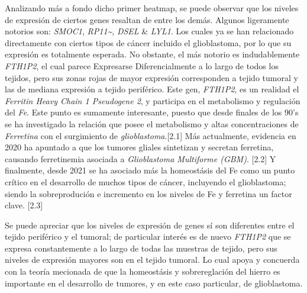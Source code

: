 \documentclass[
]{article}
\begin{document}
Analizando más a fondo dicho primer heatmap, se puede observar que los
niveles de expresión de ciertos genes resaltan de entre los demás.
Algunos ligeramente notorios son: \emph{SMOC1},
\emph{RP11\textasciitilde{}}, \emph{DSEL} \& \emph{LYL1}. Los cuales ya
se han relacionado directamente con ciertos tipos de cáncer incluido el
glioblastoma, por lo que su expresión es totalmente esperada. No
obstante, el más notorio es indudablemente \emph{FTH1P2}, el cual parece
Expresarse Diferencialmente a lo largo de todos los tejidos, pero sus
zonas rojas de mayor expresión corresponden a tejido tumoral y las de
mediana expresión a tejido periférico. Este gen, \emph{FTH1P2}, es un
realidad el \emph{Ferritin Heavy Chain 1 Pseudogene 2}, y participa en
el metabolismo y regulación del \emph{Fe}. Este punto es sumamente
interesante, puesto que desde finales de los 90's se ha investigado la
relación que posee el metabolismo y altas concentraciones de
\emph{Ferretina} con el surgimiento de \emph{glioblastoma}.{[}2.1{]} Más
actualmente, evidencia en 2020 ha apuntado a que los tumores gliales
sintetizan y secretan ferretina, causando ferretinemia asociada a
\emph{Glioblastoma Multiforme (GBM)}. {[}2.2{]} Y finalmente, desde 2021
se ha asociado más la homeostásis del Fe como un punto crítico en el
desarrollo de muchos tipos de cáncer, incluyendo el glioblastoma; siendo
la sobreprodución e incremento en los niveles de Fe y ferretina un
factor clave. {[}2.3{]}

Se puede apreciar que los niveles de expresión de genes sí son
diferentes entre el tejido periférico y el tumoral; de particular
interés es de nuevo \emph{FTH1P2} que se expresa constantemente a lo
largo de todas las muestras de tejido, pero sus niveles de expresión
mayores son en el tejido tumoral. Lo cual apoya y concuerda con la
teoría mecionada de que la homeostásis y sobrereglación del hierro es
importante en el desarrollo de tumores, y en este caso particular, de
glioblastoma.
\end{document}
